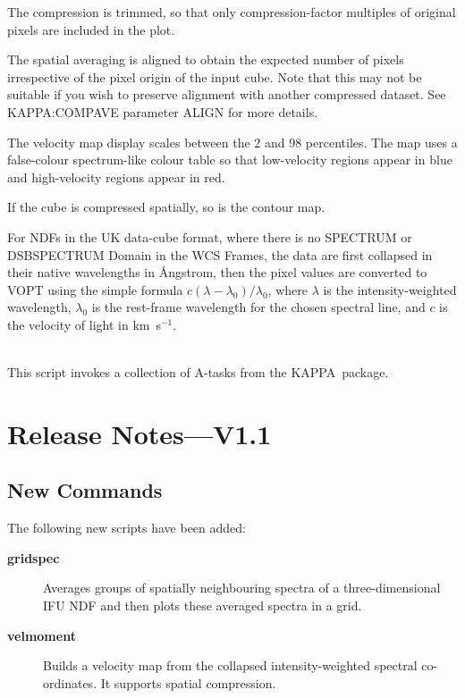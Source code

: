 \documentclass[twoside,11pt]{article}
\newcommand{\htmlref}[2]{#1}
\newcommand{\xref}[3]{#1}
\renewcommand{\_}{\texttt{\symbol{95}}}
\newcommand{\KAPPA}{{\footnotesize KAPPA}\normalsize}
\newcommand{\KAPPAref}{\xref{\KAPPA}{sun95}{}}
\newcommand{\sstimplementationstatus}[1]{
   \item[{Implementation Status:}] \mbox{} \\[1.3ex] #1}
\newcommand{\sstitem}{\item}
\newcommand{\sstimplementationstatus}[1]{\item[Implementation Status:]
      \begin{description}
         #1
      \end{description}
   }
\begin{document}
{{{         \sstitem
         The compression is trimmed, so that only compression-factor
         multiples of original pixels are included in the plot.

         \sstitem
         The spatial averaging is aligned to obtain the expected number
         of pixels irrespective of the pixel origin of the input cube.
         Note that this may not be suitable if you wish to preserve alignment
         with another compressed dataset.  See \xref{KAPPA:COMPAVE}{sun95}{COMPAVE}
         parameter ALIGN for more details.

         \sstitem
         The velocity map display scales between the 2 and 98 percentiles.
         The map uses a false-colour spectrum-like colour table so that
         low-velocity regions appear in blue and high-velocity regions
         appear in red.

         \sstitem
         If the cube is compressed spatially, so is the contour map.

         \sstitem
         For NDFs in the \xref{UK data-cube format}{sc16}{sc16_teifufile},
         where there is no \xref{SPECTRUM or DSBSPECTRUM Domain}{sun95}{se_domains}
         in the WCS Frames, the data are first collapsed in their native wavelengths
         in {\AA}ngstrom, then the pixel values are converted to VOPT using the simple
         formula $c(\lambda-\lambda_{0})/\lambda_{0}$, where $\lambda$ is the
         intensity-weighted wavelength, $\lambda_{0}$ is the rest-frame wavelength
         for the chosen spectral line, and $c$ is the velocity of light in km~s$^{-1}$.
      }
   }
   \sstimplementationstatus{
      This script invokes a collection of A-tasks from the \KAPPAref\ package.
   }
}

\newpage
\section{Release Notes---V1.1}

\subsection{New Commands}
The following new scripts have been added:

\begin{description}
   \item [\htmlref{{\bf gridspec}}{gridspec}] \mbox{}
       Averages groups of spatially neighbouring spectra of a
       three-dimensional IFU NDF and then plots these averaged spectra
       in a grid.
   \item [\htmlref{{\bf velmoment}}{velmoment}] \mbox{}
       Builds a velocity map from the collapsed intensity-weighted
       spectral co-ordinates.  It supports spatial compression.
\end{description}
\end{document}
